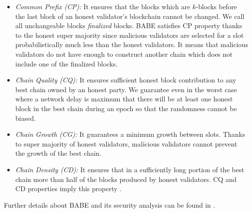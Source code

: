 \begin{itemize}
	\item \emph{Common Prefix (CP):} 
	 It ensures that the blocks which are $ k $-blocks before the last block of an honest validator's blockchain cannot be changed. We call  all unchangeable blocks  \emph{finalized} blocks. BABE satisfies CP property thanks to the honest super majority since malicious validators are selected for a slot probabilistically much less than the honest validators. It means that malicious validators do
	  not have enough 
	  to construct another chain which does not include one of the finalized blocks.
	\item \emph{Chain Quality (CQ):} It ensures sufficient honest block contribution to any best chain owned by an honest party.	We guarantee even in the worst case where a network delay is maximum that there will be at least one honest block in the best chain during an epoch so that the randomness cannot be biased.
	\item \emph{Chain Growth (CG):} It guarantees a minimum growth between slots. Thanks to super majority of honest validators, malicious validators cannot prevent the growth of the best chain.	
	
	\item \emph{Chain Density (CD):} It ensures that in a sufficiently long portion of the best chain more than half of the blocks produced by honest validators. CQ and CD properties %
	imply this property \cite{Praos}.
\end{itemize}
Further details about BABE and  its security analysis can be found in \cite{babe}.

